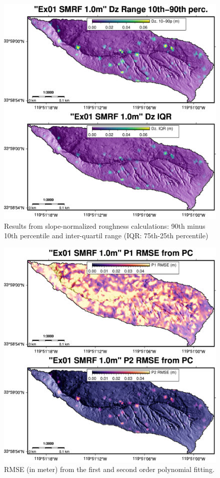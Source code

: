 \documentclass[a4paperpaper,,tablecaptionabove]{scrartcl}
\begin{document}
\begin{figure}
\centering
\includegraphics[width=\textwidth,height=0.9\textheight]{./tex2pdf.-e6884bf2dada0f3b/835f403ed54a91212c9828260d87dcc7bc64d68c.png}
\caption{Results from slope-normalized roughness calculations: 90th
minus 10th percentile and inter-quartil range (IQR: 75th-25th
percentile) \label{Fig:Ex01_cl2_1.0m_2panel_DZ9010P_IQR}}
\end{figure}

\begin{figure}
\centering
\includegraphics[width=\textwidth,height=0.9\textheight]{./tex2pdf.-e6884bf2dada0f3b/5ca5cbbd3a006a2939910b7f6d9a4fef85b388a3.png}
\caption{RMSE (in meter) from the first and second order polynomial
fitting. \label{Fig:Ex01_cl2_1.0m_2panel_RMSE}}
\end{figure}
\end{document}
